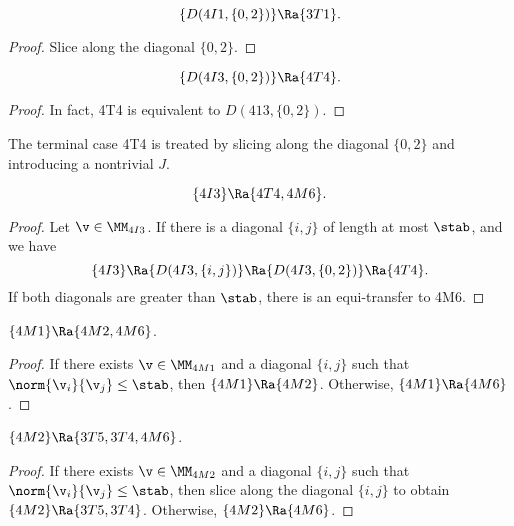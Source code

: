 \begin{lemma}[]
\[
\{D(4I1,\{0,2\})\}\Ra \{3T1\}.
\]
\end{lemma}

\begin{proof}
Slice along the diagonal $\{0,2\}$.
\end{proof}

\begin{lemma}[]
\[
\{D(4I3,\{0,2\})\}\Ra \{4T4\}.
\]
\end{lemma}

\begin{proof}
In fact,  4T4 is equivalent to $D(413,\{0,2\})$.
\end{proof}

\begin{remark}  The terminal case 4T4 is treated by slicing along the diagonal $\{0,2\}$ and introducing
a nontrivial $J$.
\end{remark}

\begin{lemma}[]
\[
\{4I3\}\Ra\{4T4,4M6\}.
\]
\end{lemma}

\begin{proof}
Let $\v\in \MM_{4I3}$.  
If there is a diagonal $\{i,j\}$ of length at most $\stab$, and we have
\[
\{4I3\}\Ra\{D(4I3,\{i,j\})\}\Ra \{D(4I3,\{0,2\})\} \Ra\{4T4\}.
\]
If both diagonals are greater than $\stab$, there is an equi-transfer to 4M6.
\end{proof}

\begin{lemma}[]
$\{4M1\}\Ra\{4M2,4M6\}$.
\end{lemma}

\begin{proof} 
If there exists $\v\in \MM_{4M1}$ and a diagonal $\{i,j\}$ such that $\norm{\v_i}{\v_j}\le \stab$,
then $\{4M1\}\Ra\{4M2\}$.  Otherwise, $\{4M1\}\Ra\{4M6\}$.
\end{proof}

\begin{lemma}[]
$\{4M2\}\Ra\{3T5,3T4,4M6\}$.
\end{lemma}

\begin{proof}
If there exists $\v\in \MM_{4M2}$ and a diagonal $\{i,j\}$ such that $\norm{\v_i}{\v_j}\le \stab$,
then slice along the diagonal $\{i,j\}$ to obtain $\{4M2\}\Ra \{3T5,3T4\}$.
Otherwise, $\{4M2\}\Ra\{4M6\}$.
\end{proof}

